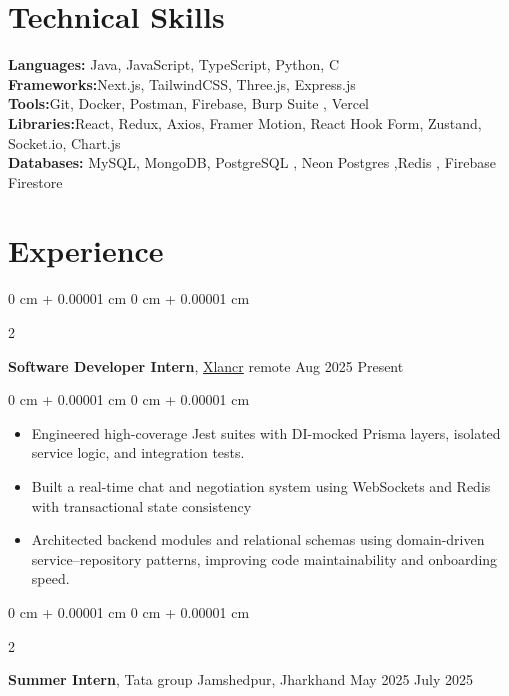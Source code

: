 \documentclass[10pt, letterpaper]{article}
\newenvironment{highlights}{
    \begin{itemize}[
        topsep=0.10 cm,
        parsep=0.10 cm,
        partopsep=0pt,
        itemsep=0pt,
        leftmargin=0 cm + 10pt
    ]
}{
    \end{itemize}
}
\newenvironment{onecolentry}{
    \begin{adjustwidth}{
        0 cm + 0.00001 cm
    }{
        0 cm + 0.00001 cm
    }
}{
    \end{adjustwidth}
}
\newenvironment{twocolentry}[2][]{
    \onecolentry
    \def\secondColumn{#2}
    \setcolumnwidth{\fill, 4.5 cm}
    \begin{paracol}{2}
}{
    \switchcolumn \raggedleft \secondColumn
    \end{paracol}
    \endonecolentry
}
\begin{document}
\section{Technical Skills}
\textbf{Languages:} Java, JavaScript, TypeScript, Python, C \\
\textbf{Frameworks:}Next.js, TailwindCSS, Three.js, Express.js \\
\textbf{Tools:}Git, Docker, Postman, Firebase, Burp Suite , Vercel\\
\textbf{Libraries:}React, Redux, Axios, Framer Motion, React Hook Form, Zustand, Socket.io, Chart.js \\
\textbf{Databases:}  MySQL, MongoDB, PostgreSQL , Neon Postgres ,Redis , Firebase Firestore\\

    \section{Experience}

        \begin{twocolentry}{
            Aug 2025 \textendash Present 
        }
            \textbf{Software Developer Intern}, \href{https://xlancr.com/}{Xlancr} \textendash remote \end{twocolentry}

        \vspace{0.10 cm}
        \begin{onecolentry}
            \begin{highlights}
                \item  Engineered high-coverage Jest suites with DI-mocked Prisma layers, isolated service logic, and integration tests.
                \item Built a real-time chat and negotiation system using WebSockets and Redis with transactional state consistency
                \item Architected backend modules and relational schemas using domain-driven service–repository patterns, improving code maintainability and onboarding speed.
                
                
            \end{highlights}
        \end{onecolentry}
                \vspace{0.12 cm}

        \begin{twocolentry}{
            May 2025 \textendash July 2025 
        }
            \textbf{Summer Intern}, Tata group \textendash   Jamshedpur, Jharkhand\end{twocolentry}
\end{document}
